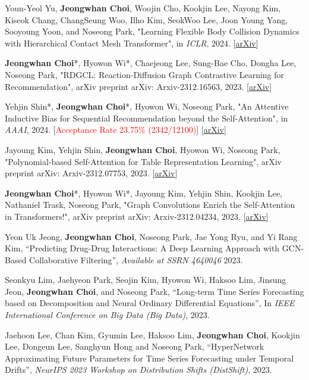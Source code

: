 \documentclass[10pt]{article}
\newenvironment{changemargin}[2]{
  \begin{list}{}{
    \setlength{\topsep}{0pt}
    \setlength{\leftmargin}{#1}
    \setlength{\rightmargin}{#2}
    \setlength{\listparindent}{\parindent}
    \setlength{\itemindent}{\parindent}
    \setlength{\parsep}{\parskip}
  }
  \item[]}{\end{list}
}
\newcommand{\presentation}[2]{
	{#1} \hfill \emph{#2}\\ \bigskip
}
\newcommand{\RED}[1]{\textcolor{red}{#1}}
\newenvironment{body} {
	\vspace*{-16pt}
	\begin{changemargin}{-0.25in}{-0.5in}
  }
	{\end{changemargin}
}
\begin{document}
\begin{body}
	\vspace{14pt}
 
\presentation{
 Youn-Yeol Yu, \textbf{Jeongwhan Choi}, Woojin Cho, Kookjin Lee, Nayong Kim, Kiseok Chang, ChangSeung Woo, Ilho Kim, SeokWoo Lee, Joon Young Yang, Sooyoung Yoon, and Noseong Park, "Learning Flexible Body Collision Dynamics with Hierarchical Contact Mesh Transformer",  in \textit{ICLR}, 2024. [\href{https://arxiv.org/abs/2312.12467}{arXiv}]}{}

 
\presentation{
\textbf{Jeongwhan Choi}*, Hyowon Wi*, Chaejeong Lee, Sung-Bae Cho, Dongha Lee, Noseong Park, "RDGCL: Reaction-Diffusion Graph Contrastive Learning for Recommendation",  arXiv preprint arXiv: Arxiv-2312.16563, 2023. [\href{https://arxiv.org/abs/2312.16563}{arXiv}]}{}

\presentation{
 Yehjin Shin*, \textbf{Jeongwhan Choi}*, Hyowon Wi, Noseong Park, "An Attentive Inductive Bias for Sequential Recommendation beyond the Self-Attention",  in \textit{AAAI}, 2024. [\RED{Acceptance Rate 23.75\% (2342/12100)}] [\href{https://arxiv.org/abs/2312.10325}{arXiv}]}{}

\presentation{
Jayoung Kim, Yehjin Shin, \textbf{Jeongwhan Choi}, Hyowon Wi, Noseong Park, "Polynomial-based Self-Attention for Table Representation Learning",  arXiv preprint arXiv: Arxiv-2312.07753, 2023. [\href{https://arxiv.org/abs/2312.07753}{arXiv}]}{}

\presentation{
\textbf{Jeongwhan Choi}*, Hyowon Wi*, Jayoung Kim, Yehjin Shin, Kookjin Lee, Nathaniel Trask, Noseong Park, "Graph Convolutions Enrich the Self-Attention in Transformers!",  arXiv preprint arXiv: Arxiv-2312.04234, 2023. [\href{https://arxiv.org/abs/2312.04234}{arXiv}]}{}


\presentation{
Yeon Uk Jeong, \textbf{Jeongwhan Choi}, Noseong Park, Jae Yong Ryu, and Yi Rang Kim, ``Predicting Drug-Drug Interactions: A Deep Learning Approach with GCN-Based Collaborative Filtering'', \textit{Available at SSRN 4640046} 2023.}{}

\presentation{
 Seonkyu Lim, Jaehyeon Park, Seojin Kim, Hyowon Wi, Haksoo Lim, Jinsung Jeon, \textbf{Jeongwhan Choi}, and Noseong Park, ``Long-term Time Series Forecasting based on Decomposition and Neural Ordinary Differential Equations'', In \emph{IEEE International Conference on Big Data (Big Data)}, 2023.}{}

\presentation{
Jaehoon Lee, Chan Kim, Gyumin Lee, Haksoo Lim, \textbf{Jeongwhan Choi}, Kookjin Lee, Dongeun Lee, Sanghyun Hong and Noseong Park, ``HyperNetwork Approximating Future Parameters for Time Series Forecasting under Temporal Drifts'', \emph{NeurIPS 2023 Workshop on Distribution Shifts (DistShift)}, 2023.}{}


\end{body}
\end{document}
